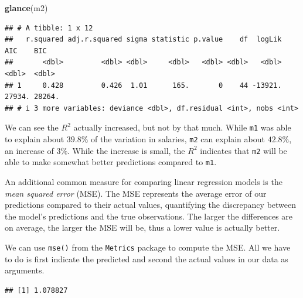 \documentclass[
]{book}
\newenvironment{Shaded}{\begin{snugshade}}{\end{snugshade}}
\newcommand{\FunctionTok}[1]{\textcolor[rgb]{0.13,0.29,0.53}{\textbf{#1}}}
\newcommand{\NormalTok}[1]{#1}
\newcommand{\SpecialCharTok}[1]{\textcolor[rgb]{0.81,0.36,0.00}{\textbf{#1}}}
\begin{document}
\begin{Shaded}
\begin{Highlighting}[]
\FunctionTok{glance}\NormalTok{(m2)}
\end{Highlighting}
\end{Shaded}

\begin{verbatim}
## # A tibble: 1 x 12
##   r.squared adj.r.squared sigma statistic p.value    df  logLik    AIC    BIC
##       <dbl>         <dbl> <dbl>     <dbl>   <dbl> <dbl>   <dbl>  <dbl>  <dbl>
## 1     0.428         0.426  1.01      165.       0    44 -13921. 27934. 28264.
## # i 3 more variables: deviance <dbl>, df.residual <int>, nobs <int>
\end{verbatim}

We can see the \(R^2\) actually increased, but not by that much. While \texttt{m1} was
able to explain about \(39.8\%\) of the variation in salaries, \texttt{m2} can explain
about \(42.8\%\), an increase of \(3\%\). While the increase is small, the \(R^2\)
indicates that \texttt{m2} will be able to make somewhat better predictions compared to
\texttt{m1}.

An additional common measure for comparing linear regression models is the
\emph{mean squared error} (MSE). The MSE represents the average error of our
predictions compared to their actual values, quantifying the discrepancy between
the model's predictions and the true observations. The larger the differences
are on average, the larger the MSE will be, thus a lower value is actually
better.

We can use \texttt{mse()} from the \texttt{Metrics} package to compute the MSE. All we have to
do is first indicate the predicted and second the actual values in our data as
arguments.

\begin{Shaded}
\end{Shaded}

\begin{verbatim}
## [1] 1.078827
\end{verbatim}

\begin{Shaded}
\end{Shaded}
\end{document}

